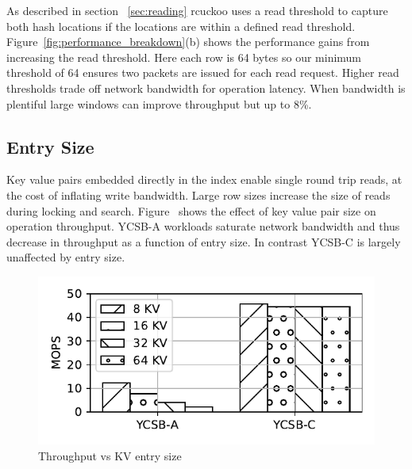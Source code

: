 As described in section ~\ref{sec:reading} rcuckoo uses a
read threshold to capture both hash locations if the
locations are within a defined read threshold.
Figure~\ref{fig:performance_breakdown}(b) shows the performance gains
from increasing the read threshold. Here each row is 64
bytes so our minimum threshold of 64 ensures two packets are
issued for each read request. Higher read thresholds trade
off network bandwidth for operation latency. When bandwidth
is plentiful large windows can improve throughput but up to
8\%.



\subsection{Entry Size}

Key value pairs embedded directly in the index enable single
round trip reads, at the cost of inflating write bandwidth.
Large row sizes increase the size of reads during locking
and search. Figure~\cite{fig:entry_size} shows the effect of
key value pair size on operation throughput. YCSB-A
workloads saturate network bandwidth and thus decrease in
throughput as a function of entry size. In contrast YCSB-C
is largely unaffected by entry size. 


\begin{figure}[ht]
    \includegraphics[width=0.99\linewidth]{fig/entry_size.pdf}
    \caption{Throughput vs KV entry size}
    \label{fig:entry_size}
\end{figure}


